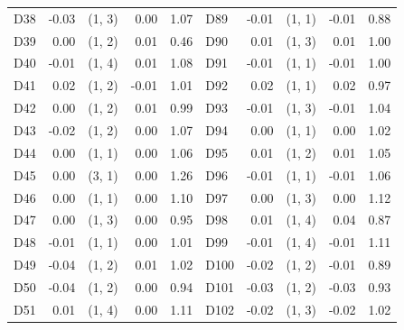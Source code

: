 \begin{table}[p]
\begin{tabular}{l|r|lr|r||l|r|lr|r}
D38 & -0.03 & (1, 3) & 0.00 & 1.07 & D89 & -0.01 & (1, 1) & -0.01 & 0.88 \\
D39 & 0.00 & (1, 2) & 0.01 & 0.46 & D90 & 0.01 & (1, 3) & 0.01 & 1.00 \\
D40 & -0.01 & (1, 4) & 0.01 & 1.08 & D91 & -0.01 & (1, 1) & -0.01 & 1.00 \\
D41 & 0.02 & (1, 2) & -0.01 & 1.01 & D92 & 0.02 & (1, 1) & 0.02 & 0.97 \\
D42 & 0.00 & (1, 2) & 0.01 & 0.99 & D93 & -0.01 & (1, 3) & -0.01 & 1.04 \\
D43 & -0.02 & (1, 2) & 0.00 & 1.07 & D94 & 0.00 & (1, 1) & 0.00 & 1.02 \\
D44 & 0.00 & (1, 1) & 0.00 & 1.06 & D95 & 0.01 & (1, 2) & 0.01 & 1.05 \\
D45 & 0.00 & (3, 1) & 0.00 & 1.26 & D96 & -0.01 & (1, 1) & -0.01 & 1.06 \\
D46 & 0.00 & (1, 1) & 0.00 & 1.10 & D97 & 0.00 & (1, 3) & 0.00 & 1.12 \\
D47 & 0.00 & (1, 3) & 0.00 & 0.95 & D98 & 0.01 & (1, 4) & 0.04 & 0.87 \\
D48 & -0.01 & (1, 1) & 0.00 & 1.01 & D99 & -0.01 & (1, 4) & -0.01 & 1.11 \\
D49 & -0.04 & (1, 2) & 0.01 & 1.02 & D100 & -0.02 & (1, 2) & -0.01 & 0.89 \\
D50 & -0.04 & (1, 2) & 0.00 & 0.94 & D101 & -0.03 & (1, 2) & -0.03 & 0.93 \\
D51 & 0.01 & (1, 4) & 0.00 & 1.11 & D102 & -0.02 & (1, 3) & -0.02 & 1.02 \\
\bottomrule
\end{tabular}
\end{table}




 





  






    
    










    



